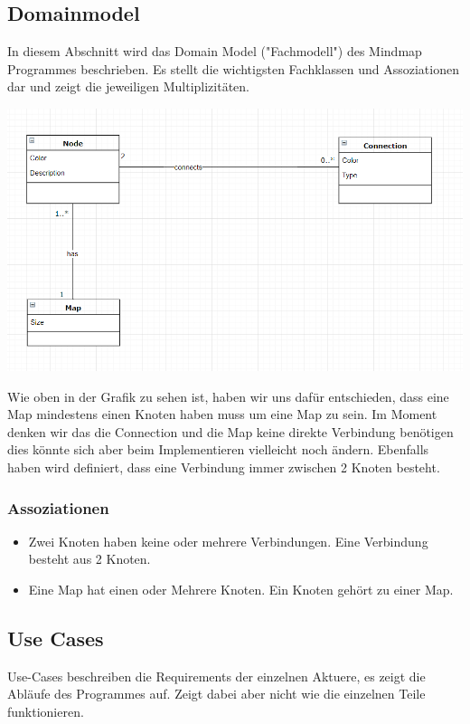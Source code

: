 \documentclass[a4paper,parskip]{scrartcl}
\begin{document}
\subsection{Domainmodel}
In diesem Abschnitt wird das Domain Model ("{}Fachmodell"{}) des Mindmap Programmes beschrieben. Es stellt die 
wichtigsten Fachklassen und Assoziationen dar und zeigt die jeweiligen Multiplizitäten.

\includegraphics[width=\linewidth]{DomainModel.PNG}

Wie oben in der Grafik zu sehen ist, haben wir uns dafür entschieden, dass eine Map mindestens einen Knoten haben muss um eine Map zu sein. Im Moment denken wir das die Connection und die Map keine direkte Verbindung benötigen dies könnte sich aber beim Implementieren vielleicht noch ändern. Ebenfalls haben wird definiert, dass eine Verbindung immer zwischen 2 Knoten besteht.

\subsubsection{Assoziationen}
\begin{itemize}
\item Zwei Knoten haben keine oder mehrere Verbindungen. Eine Verbindung besteht aus 2 Knoten.
\item Eine Map hat einen oder Mehrere Knoten. Ein Knoten gehört zu einer Map.
\end{itemize}

\subsection{Use Cases}
Use-Cases beschreiben die Requirements der einzelnen Aktuere, es zeigt die Abläufe des Programmes auf. Zeigt dabei aber nicht wie die einzelnen Teile funktionieren.
\end{document}
